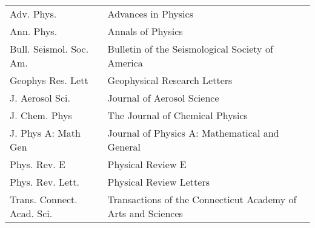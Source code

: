
\sectionfont{\fontsize{24}{22}\selectfont}
\newpage


\begin{center}

\begin{tabular}{lp{}}

Adv. Phys.\dotfill & Advances in Physics  \\
Ann. Phys. \dotfill & Annals of Physics \\
Bull. Seismol. Soc. Am. \dotfill & Bulletin of the Seismological Society of America \\

Geophys Res. Lett \dotfill & Geophysical Research Letters \\

J. Aerosol Sci. \dotfill & Journal of Aerosol Science\\
J. Chem. Phys \dotfill & The Journal of Chemical Physics \\
J. Phys A: Math Gen \dotfill & Journal of Physics A: Mathematical and General \\

Phys. Rev. E \dotfill & Physical Review E \\
Phys. Rev. Lett. \dotfill & Physical Review Letters \\

Trans. Connect. Acad. Sci. \dotfill & Transactions of the Connecticut Academy of Arts and Sciences \\

\end{tabular}
\end{center}

\nocite{*}




